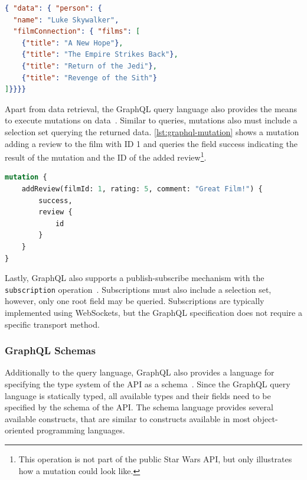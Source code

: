 \begin{lstlisting}[language=json, caption={SWAPI GraphQL Response}, label={lst:graphql-response}]
{ "data": { "person": {
  "name": "Luke Skywalker",
  "filmConnection": { "films": [
    {"title": "A New Hope"},
    {"title": "The Empire Strikes Back"},
    {"title": "Return of the Jedi"},
    {"title": "Revenge of the Sith"}
]}}}}
\end{lstlisting}

Apart from data retrieval, the GraphQL query language also provides the means to execute mutations on data~\cite{Facebook2018}.
Similar to queries, mutations also must include a selection set querying the returned data.
\autoref{lst:graphql-mutation} shows a mutation adding a review to the film with ID 1 and queries the field success indicating the result of the mutation and the ID of the added review\footnote{This operation is not part of the public Star Wars \ac{API}, but only illustrates how a mutation could look like.}.

\begin{minipage}{\linewidth}
\begin{lstlisting}[language=graphql, caption={GraphQL Mutations}, label={lst:graphql-mutation}]
mutation {
    addReview(filmId: 1, rating: 5, comment: "Great Film!") {
        success,
        review {
            id
        }
    }
}    
\end{lstlisting}
\end{minipage}

Lastly, GraphQL also supports a publish-subscribe mechanism with the \texttt{subscription} operation~\cite{Facebook2018}.
Subscriptions must also include a selection set, however, only one root field may be queried.
Subscriptions are typically implemented using WebSockets, but the GraphQL specification does not require a specific transport method.

\subsubsection{GraphQL Schemas}\label{sec:graphql-schemas}

Additionally to the query language, GraphQL also provides a language for specifying the type system of the \ac{API} as a schema~\cite{Diaz2020, Hartig2018}.
Since the GraphQL query language is statically typed, all available types and their fields need to be specified by the schema of the \ac{API}.
The schema language provides several available constructs, that are similar to constructs available in most object-oriented programming languages.

